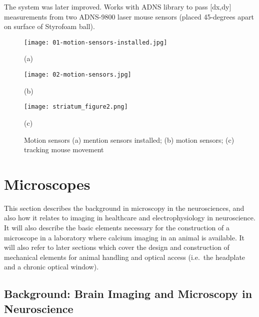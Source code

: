 \documentclass[../main.tex]{subfiles}
\begin{document}
The system was later improved.
Works with ADNS library to pass {[}dx,dy{]} measurements from two ADNS-9800 laser mouse sensors (placed 45-degrees apart on surface of Styrofoam ball).

\begin{figure}[htb]
	\begin{minipage}[t]{0.45\linewidth}\centering
		\texttt{[image: 01-motion-sensors-installed.jpg]}
		\centerline{(a)}
	\end{minipage}
	\hfill
	\begin{minipage}[t]{0.45\linewidth}\centering
		\texttt{[image: 02-motion-sensors.jpg]}
		\centerline{(b)}
	\end{minipage}
	\begin{minipage}[t]{\linewidth}\centering
		\texttt{[image: striatum\_figure2.png]}
		\centerline{(c)}
	\end{minipage}
	\caption{
		Motion sensors (a) mention sensors installed;
		(b) motion sensors; (c) tracking mouse movement}
	\label{fig:motion sensors}
\end{figure}

\section{
  Microscopes}\label{sec:microscopes}

This section describes the background in microscopy in the neurosciences, and also how it relates to imaging in healthcare and electrophysiology in neuroscience.
It will also describe the basic elements necessary for the construction of a microscope in a laboratory where calcium imaging in an animal is available.
It will also refer to later sections which cover the design and construction of mechanical elements for animal handling and optical access (i.e.~the headplate and a chronic optical window).

\subsection{
	Background: Brain Imaging and Microscopy in Neuroscience}\label{sec:background-brain-imaging-and-microscopy-in-neuroscience}
\end{document}
